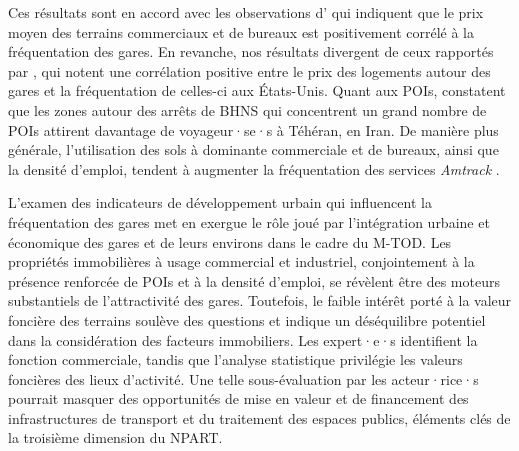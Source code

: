\begin{refsegment}
Ces résultats sont en accord avec les observations d'\textcolor{blue}{\textcite[11]{amini_pishro_node_2022}} qui indiquent que le prix moyen des terrains commerciaux et de bureaux est positivement corrélé à la fréquentation des gares. En revanche, nos résultats divergent de ceux rapportés par \textcolor{blue}{\textcite[9]{cummings_does_2022}}, qui notent une corrélation positive entre le prix des logements autour des gares et la fréquentation de celles-ci aux États-Unis. Quant aux \acrshort{POIs}, \textcolor{blue}{\textcite[5]{pezeshknejad_evaluating_2020}} constatent que les zones autour des arrêts de \acrshort{BHNS} qui concentrent un grand nombre de \acrshort{POIs} attirent davantage de voyageur·se·s à Téhéran, en Iran. De manière plus générale, l'utilisation des sols à dominante commerciale et de bureaux, ainsi que la densité d'emploi, tendent à augmenter la fréquentation des services \textsl{Amtrack} \textcolor{blue}{\autocite[8]{cummings_does_2022}}.%

L'examen des indicateurs de développement urbain qui influencent la fréquentation des gares met en exergue le rôle joué par l'intégration urbaine et économique des gares et de leurs environs dans le cadre du \acrshort{M-TOD}. Les propriétés immobilières à usage commercial et industriel, conjointement à la présence renforcée de \acrshort{POIs} et à la densité d'emploi, se révèlent être des moteurs substantiels de l'attractivité des gares. Toutefois, le faible intérêt porté à la valeur foncière des terrains soulève des questions et indique un déséquilibre potentiel dans la considération des facteurs immobiliers. Les expert·e·s identifient la fonction commerciale, tandis que l'analyse statistique privilégie les valeurs foncières des lieux d'activité. Une telle sous-évaluation par les acteur·rice·s pourrait masquer des opportunités de mise en valeur et de financement des infrastructures de transport et du traitement des espaces publics, éléments clés de la troisième dimension du \acrshort{NPART}.%


\end{refsegment}
